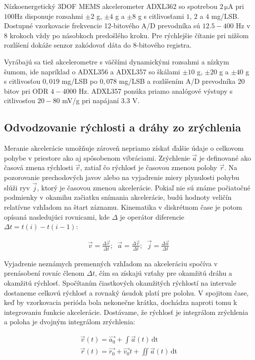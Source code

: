 Nízkoenergetický 3DOF MEMS akcelerometer ADXL362 \cite{adxl362} so spotrebou $2\,\mathrm{\mu A}$ pri $100$Hz disponuje
rozsahmi $\pm2$ g, $\pm4$ g a $\pm8$ g s citlivosťami $1$, $2$ a $4$ mg/LSB. Dostupné vzorkovacie frekvencie 12-bitového A/D prevodníka sú
$12.5 - 400$ Hz v 8 krokoch vždy po násobkoch predošlého kroku. Pre rýchlejšie čítanie pri nižšom rozlíšení dokáže senzor zakódovať dáta
do 8-bitového registra.

Vyrábajú sa tiež akcelerometre s väčšími dynamickými rozsahmi a nízkym šumom, ide napríklad o ADXL356 a ADXL357 \cite{adxl357} so
škálami $\pm 10$ g, $\pm 20$ g a $\pm 40$ g s citlivosťou $0,019$ mg/LSB po $0,078$ mg/LSB a rozlíšením A/D prevodníka 20 bitov pri
ODR $4 - 4000$ Hz. ADXL357 ponúka priamo analógové výstupy s citlivosťou $20 - 80$ mV/g pri napájaní $3.3$ V.

\subsection{Odvodzovanie rýchlosti a dráhy zo zrýchlenia}
Meranie akcelerácie umožňuje zároveň nepriamo získať ďalšie údaje o celkovom pohybe v priestore ako aj spôsobenom vibráciami.
Zrýchlenie $\vec{a}$ je definované ako časová zmena rýchlosti $\vec{v}$, zatiaľ čo rýchlosť je časovou zmenou polohy $\vec{r}$. Na
pozorovanie prechodových javov alebo na vyjadrenie miery plynulosti pohybu slúži ryv $\vec{j}$, ktorý je časovou zmenou akcelerácie.
Pokiaľ nie sú známe počiatočné podmienky v okamihu začiatku snímania akcelerácie, budú hodnoty veličín relatívne vzhľadom na
štart záznamu. Kinematika v diskrétnom čase je potom opísaná nasledujúci rovnicami, kde $\Delta$ je operátor diferencie
$\Delta t = t(i) - t(i-1)$:
\begin{ceqn}\begin{align}
   \vec{v} = \frac{\Delta \vec{r}}{\Delta t}; \;\;
   \vec{a} = \frac{\Delta \vec{v}}{\Delta t}; \;\;
   \vec{j} = \frac{\Delta \vec{a}}{\Delta t}
\end{align}\end{ceqn}

Vyjadrenie neznámych premenných vzhľadom na akceleráciu spočíva v prenásobení rovníc členom $\Delta t$, čím sa získajú
vzťahy pre okamžitú dráhu a okamžitú rýchlosť. Spočítaním čiastkových okamžitých rýchlostí na intervale dostaneme celkovú rýchlosť a
rovnaký úsudok platí pre polohu. V spojitom čase, keď by vzorkovacia perióda bola nekonečne krátka, dochádza naproti tomu k
integrovaniu funkcie akcelerácie. Dostávame, že rýchlosť je integrálom zrýchlenia a poloha je dvojným integrálom zrýchlenia:
\begin{ceqn}\begin{align}
   \vec{v}(t) = \vec{a_0} + \int{\vec{a}(t)\,\mathrm{dt}} \\
   \vec{r}(t) = \vec{r_0} + \vec{v_0}t + \iint{\vec{a}(t)\,\mathrm{dt}}
\end{align}\end{ceqn}


